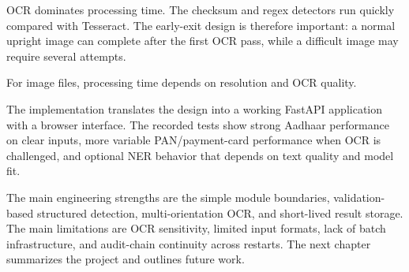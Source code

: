 \bigskip

OCR dominates processing time. The checksum and regex detectors run quickly compared with Tesseract. The early-exit design is therefore important: a normal upright image can complete after the first OCR pass, while a difficult image may require several attempts.

\bigskip

For image files, processing time depends on resolution and OCR quality.

The implementation translates the design into a working FastAPI application with a browser interface. The recorded tests show strong Aadhaar performance on clear inputs, more variable PAN/payment-card performance when OCR is challenged, and optional NER behavior that depends on text quality and model fit.

The main engineering strengths are the simple module boundaries, validation-based structured detection, multi-orientation OCR, and short-lived result storage. The main limitations are OCR sensitivity, limited input formats, lack of batch infrastructure, and audit-chain continuity across restarts. The next chapter summarizes the project and outlines future work.
